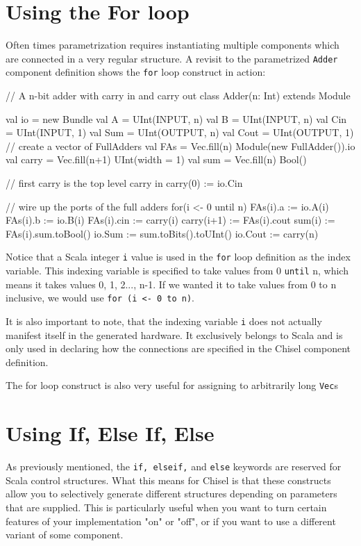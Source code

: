 \section{Using the For loop}

Often times parametrization requires instantiating multiple components which are connected in a very regular structure. A revisit to the parametrized \verb+Adder+ component definition shows the \verb+for+ loop construct in action:

\begin{scala}
// A n-bit adder with carry in and carry out
class Adder(n: Int) extends Module {
  val io = new Bundle {
    val A    = UInt(INPUT, n)
    val B    = UInt(INPUT, n)
    val Cin  = UInt(INPUT, 1)
    val Sum  = UInt(OUTPUT, n)
    val Cout = UInt(OUTPUT, 1)
  }
  // create a vector of FullAdders
  val FAs   = Vec.fill(n){ Module(new FullAdder()).io }
  val carry = Vec.fill(n+1){ UInt(width = 1) }
  val sum   = Vec.fill(n){ Bool() }

  // first carry is the top level carry in
  carry(0) := io.Cin

  // wire up the ports of the full adders
  for(i <- 0 until n) {
     FAs(i).a   := io.A(i)
     FAs(i).b   := io.B(i)
     FAs(i).cin := carry(i)
     carry(i+1) := FAs(i).cout
     sum(i)     := FAs(i).sum.toBool()
  }
  io.Sum  := sum.toBits().toUInt()
  io.Cout := carry(n)
}
\end{scala}

Notice that a Scala integer \verb+i+ value is used in the \verb+for+ loop definition as the index variable. This indexing variable is specified to take values from 0 \verb+until+ n, which means it takes values 0, 1, 2..., n-1. If we wanted it to take values from 0 to n inclusive, we would use \verb+for (i <- 0 to n)+.

It is also important to note, that the indexing variable \verb+i+ does not actually manifest itself in the generated hardware. It exclusively belongs to Scala and is only used in declaring how the connections are specified in the Chisel component definition.

The for loop construct is also very useful for assigning to arbitrarily long \verb+Vec+s 

\section{Using If, Else If, Else}

As previously mentioned, the \verb+if, elseif,+ and \verb+else+ keywords are reserved for Scala control structures. What this means for Chisel is that these constructs allow you to selectively generate different structures depending on parameters that are supplied. This is particularly useful when you want to turn certain features of your implementation "on" or "off", or if you want to use a different variant of some component.

